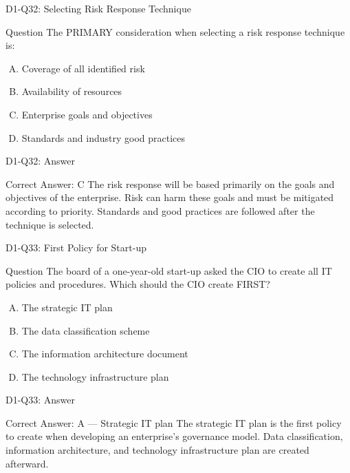 \documentclass{beamer}
\begin{document}
	\begin{frame}{D1-Q32: Selecting Risk Response Technique}
		\begin{block}{Question}
			The PRIMARY consideration when selecting a risk response technique is:
		\end{block}
		\begin{enumerate}[(A)]
			\item Coverage of all identified risk
			\item Availability of resources
			\item Enterprise goals and objectives
			\item Standards and industry good practices
		\end{enumerate}
	\end{frame}
	\begin{frame}{D1-Q32: Answer}
		\begin{block}{Correct Answer: C}
			The risk response will be based primarily on the goals and objectives of the enterprise. Risk can harm these goals and must be mitigated according to priority. Standards and good practices are followed after the technique is selected.
		\end{block}
	\end{frame}
	
	\begin{frame}{D1-Q33: First Policy for Start-up}
		\begin{block}{Question}
			The board of a one-year-old start-up asked the CIO to create all IT policies and procedures. Which should the CIO create FIRST?
		\end{block}
		\begin{enumerate}[(A)]
			\item The strategic IT plan
			\item The data classification scheme
			\item The information architecture document
			\item The technology infrastructure plan
		\end{enumerate}
	\end{frame}
	\begin{frame}{D1-Q33: Answer}
		\begin{block}{Correct Answer: A --- Strategic IT plan}
			The strategic IT plan is the first policy to create when developing an enterprise's governance model. Data classification, information architecture, and technology infrastructure plan are created afterward.
		\end{block}
	\end{frame}
	
\end{document}

